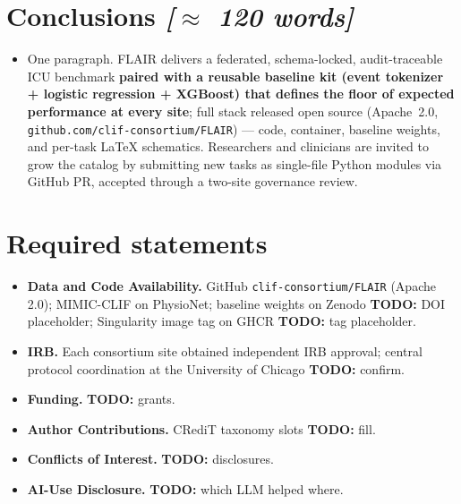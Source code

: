 \documentclass[11pt]{article}
\newcommand{\note}[1]{{\color{notecolor}\textit{[#1]}}}
\newcommand{\todo}[1]{{\color{red}\textbf{TODO:} #1}}
\begin{document}
\section{Conclusions \note{$\approx$ 120 words}}
\begin{itemize}[leftmargin=1.5em]
  \item One paragraph. FLAIR delivers a federated, schema-locked,
        audit-traceable ICU benchmark \textbf{paired with a reusable
        baseline kit (event tokenizer + logistic regression + XGBoost)
        that defines the floor of expected performance at every site};
        full stack released open source (Apache~2.0,
        \texttt{github.com/clif-consortium/FLAIR}) --- code, container,
        baseline weights, and per-task LaTeX schematics. Researchers
        and clinicians are invited to grow the catalog by submitting
        new tasks as single-file Python modules via GitHub PR,
        accepted through a two-site governance review.
\end{itemize}

\section*{Required statements}
\begin{itemize}[leftmargin=1.5em]
  \item \textbf{Data and Code Availability.} GitHub
        \texttt{clif-consortium/FLAIR} (Apache 2.0); MIMIC-CLIF on
        PhysioNet; baseline weights on Zenodo \todo{DOI placeholder};
        Singularity image tag on GHCR \todo{tag placeholder}.
  \item \textbf{IRB.} Each consortium site obtained independent IRB
        approval; central protocol coordination at the University of
        Chicago \todo{confirm}.
  \item \textbf{Funding.} \todo{grants}.
  \item \textbf{Author Contributions.} CRediT taxonomy slots \todo{fill}.
  \item \textbf{Conflicts of Interest.} \todo{disclosures}.
  \item \textbf{AI-Use Disclosure.} \todo{which LLM helped where}.
\end{itemize}
\end{document}
